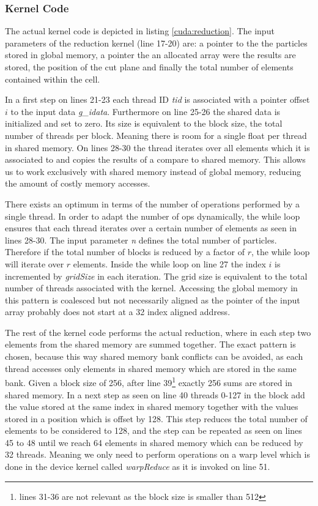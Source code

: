 \documentclass[]{article}
\begin{document}
\subsubsection{Kernel Code}\label{sec:countleftcode}
The actual kernel code is depicted in listing \ref{cuda:reduction}. The input parameters of the reduction kernel (line 17-20) are: a pointer to the the particles stored in global memory, a pointer the an allocated array were the results are stored, the position of the cut plane and finally the total number of elements contained within the cell.

In a first step on lines 21-23 each thread ID \textit{tid} is associated with a pointer offset $i$ to the input data \textit{g\_idata}. Furthermore on line 25-26 the shared data is initialized and set to zero. Its size is equivalent to the block size, the total number of threads per block. Meaning there is room for a single float per thread in shared memory. On lines 28-30 the thread iterates over all elements which it is associated to and copies the results of a compare to shared memory. This allows us to work exclusively with shared memory instead of global memory, reducing the amount of costly memory accesses.

There exists an optimum in terms of the number of operations performed by a single thread. In order to adapt the number of ops dynamically, the while loop ensures that each thread iterates over a certain number of elements as seen in lines 28-30. The input parameter \textit{n} defines the total number of particles. Therefore if the total number of blocks is reduced by a factor of $r$, the while loop will iterate over $r$ elements. Inside the while loop on line 27 the index $i$ is incremented by \textit{gridSize} in each iteration. The grid size is equivalent to the total number of threads associated with the kernel. Accessing the global memory in this pattern is coalesced but not necessarily aligned as the pointer of the input array probably does not start at a 32 index aligned address. \cite{gMem} \cite{reduction}

The rest of the kernel code performs the actual reduction, where in each step two elements from the shared memory are summed together. The exact pattern is chosen, because this way shared memory bank conflicts can be avoided, as each thread accesses only elements in shared memory which are stored in the same bank. \cite{sharedMem} Given a block size of 256, after line 39\footnote{lines 31-36 are not relevant as the block size is smaller than 512} exactly 256 sums are stored in shared memory. In a next step as seen on line 40 threads 0-127 in the block add the value stored at the same index in shared memory together with the values stored in a position which is offset by 128. This step reduces the total number of elements to be considered to 128, and the step can be repeated as seen on lines 45 to 48 until we reach 64 elements in shared memory which can be reduced by 32 threads. Meaning we only need to perform operations on a warp level which is done in the device kernel called \textit{warpReduce} as it is invoked on line 51. 
\end{document}
